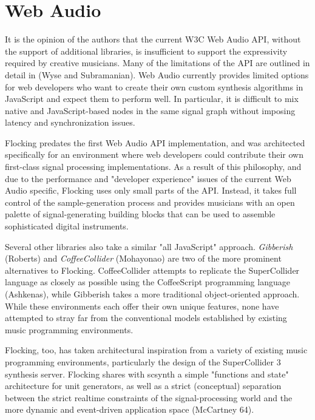 \documentclass{article}
\begin{document}
\section{Web Audio}

It is the opinion of the authors that the current W3C Web Audio API, without the support of additional libraries, is insufficient to support the expressivity required by creative musicians. Many of the limitations of the API are outlined in detail in (Wyse and Subramanian). Web Audio currently provides limited options for web developers who want to create their own custom synthesis algorithms in JavaScript and expect them to perform well. In particular, it is difficult to mix native and JavaScript-based nodes in the same signal graph without imposing latency and synchronization issues.

Flocking predates the first Web Audio API implementation, and was architected specifically for an environment where web developers could contribute their own first-class signal processing implementations. As a result of this philosophy, and due to the performance and "developer experience" issues of the current Web Audio specific, Flocking uses only small parts of the API. Instead, it takes full control of the sample-generation process and provides musicians with an open palette of signal-generating building blocks that can be used to assemble sophisticated digital instruments.

Several other libraries also take a similar "all JavaScript" approach. {\it Gibberish} (Roberts) and {\it CoffeeCollider} (Mohayonao) are two of the more prominent alternatives to Flocking. CoffeeCollider attempts to replicate the SuperCollider language as closely as possible using the CoffeeScript programming language (Ashkenas), while Gibberish takes a more traditional object-oriented approach. While these environments each offer their own unique features, none have attempted to stray far from the conventional models established by existing music programming environments.

Flocking, too, has taken architectural inspiration from a variety of existing music programming environments, particularly the design of the SuperCollider 3 synthesis server. Flocking shares with scsynth a simple "functions and state" architecture for unit generators, as well as a strict (conceptual) separation between the strict realtime constraints of the signal-processing world and the more dynamic and event-driven application space (McCartney 64).
\end{document}
